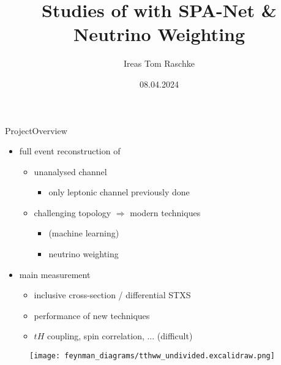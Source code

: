 \documentclass[9pt, aspectratio=169]{beamer}
\title{Studies of \ttHWW with SPA-Net \& Neutrino Weighting}
\date{08.04.2024}
\author{Ireas Tom Raschke}
\institute{II.\ Physikalisches Institut, Univ.\ of Göttingen}
\begin{document}
\begin{frame}
	\fontsize{11pt}{14pt}\selectfont
	\titlepage
\end{frame}

\begin{frame}{Project}{Overview}
	\begin{minipage}{.58\textwidth}
		\begin{itemize}
			\item full event reconstruction of \ttHWW
			\begin{itemize}
				\item unanalysed channel
				\begin{itemize}
					\item only leptonic channel previously done
				\end{itemize}  
				\item challenging topology $\Rightarrow$ modern techniques
				\begin{itemize}
					\item \spanet (machine learning)
					\item neutrino weighting
				\end{itemize}  
			\end{itemize}
			\item main measurement
			\begin{itemize}
				\item inclusive cross-section / differential STXS
				\item performance of new techniques
				\item $tH$ coupling, \HWW spin correlation, ... (difficult)
			\end{itemize}
		\end{itemize}
	\end{minipage}
	\begin{minipage}{.4\textwidth}
		\begin{figure}
			\centering
			\texttt{[image: feynman\_diagrams/tthww\_undivided.excalidraw.png]}
		\end{figure}
	\end{minipage}       	
\end{frame}
\end{document}
